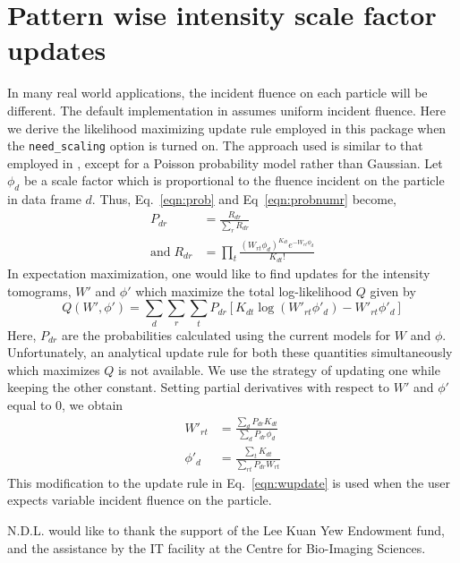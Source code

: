\documentclass[]{iucr}              %
\begin{document}
\section{Pattern wise intensity scale factor updates}\label{sec:rescaling}
In many real world applications, the incident fluence on each particle will be different. The default implementation in  assumes uniform incident fluence. Here we derive the likelihood maximizing update rule employed in this package when the \texttt{need\_scaling} option is turned on. The approach used is similar to that employed in , except for a Poisson probability model rather than Gaussian. Let $\phi_d$ be a scale factor which is proportional to the fluence incident on the particle in data frame $d$. Thus, Eq.~\ref{eqn:prob} and Eq~\ref{eqn:probnumr} become,
\begin{align}
P_{dr} &= \frac{R_{dr}}{\sum\limits_r R_{dr}} \\
\mathrm{and }\;R_{dr} &= \prod_t \frac{(W_{rt}\phi_d)^{K_{dt}} e^{-W_{rt}\phi_d}}{K_{dt}!}
\end{align}
In expectation maximization, one would like to find updates for the intensity tomograms, $W'$ and $\phi'$ which maximize the total log-likelihood $Q$ given by
\[Q(W', \phi') = \sum_d \sum_r \sum_t P_{dr} \left[K_{dt}\log(W'_{rt} \phi'_d) - W'_{rt} \phi'_d\right]\]
Here, $P_{dr}$ are the probabilities calculated using the current models for $W$ and $\phi$. Unfortunately, an analytical update rule for both these quantities simultaneously which maximizes $Q$ is not available. We use the strategy of updating one while keeping the other constant. Setting partial derivatives with respect to $W'$ and $\phi'$ equal to 0, we obtain
\begin{align}
W'_{rt} &= \frac{\sum\limits_d P_{dr} K_{dt}}{\sum\limits_d P_{dr} \phi_d} \\
\phi'_d &= \frac{\sum\limits_t K_{dt}}{\sum\limits_{rt} P_{dr} W_{rt}}
\end{align}
This modification to the update rule in Eq.~\ref{eqn:wupdate} is used when the user expects variable incident fluence on the particle.



N.D.L. would like to thank the support of the Lee Kuan Yew Endowment fund, and the assistance by the IT facility at the Centre for Bio-Imaging Sciences.
\end{document}

